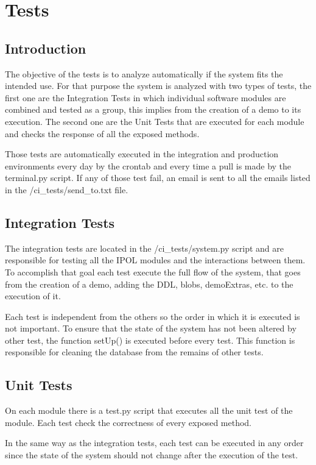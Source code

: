 \section{Tests}
\label{sec:Tests}
\subsection{Introduction}

The objective of the tests is to analyze automatically if the system fits the intended use. For that purpose the system is analyzed with two
types of tests, the first one are the Integration Tests in which individual software modules are combined and tested as a group, this implies from
the creation of a demo to its execution. The second one are the Unit Tests that are executed for each module and checks the response of all the
exposed methods.

Those tests are automatically executed in the integration and production environments every day by the crontab and every time a pull is made by 
the terminal.py script. If any of those test fail, an email is sent to all the emails listed in the /ci\_tests/send\_to.txt file.


\subsection{Integration Tests}

The integration tests are located in the /ci\_tests/system.py script and are responsible for testing all the IPOL modules and the interactions
between them. To accomplish that goal each test execute the full flow of the system, that goes from the creation of a demo, adding the DDL, blobs,
demoExtras, etc. to the execution of it.

Each test is independent from the others so the order in which it is executed is not important. To ensure that the state of the system has not been
altered by other test, the function setUp() is executed before every test. This function is responsible for cleaning the database from the 
remains of other tests.

\subsection{Unit Tests}

On each module there is a test.py script that executes all the unit test of the module. Each test check the correctness of every exposed method.

In the same way as the integration tests, each test can be executed in any order since the state of the system should not change after the execution
of the test.

